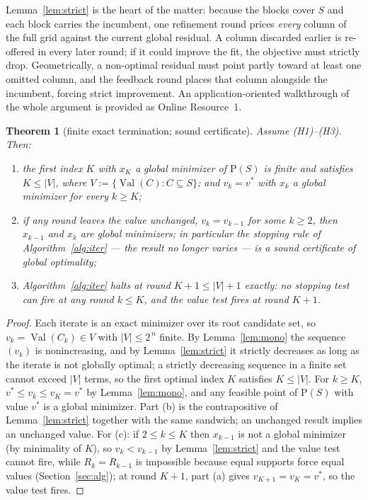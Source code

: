 \documentclass[pdflatex,sn-mathphys-num]{sn-jnl}
\theoremstyle{thmstyleone}
\newtheorem{theorem}{Theorem}
\theoremstyle{thmstyletwo}
\newcommand{\Val}{\operatorname{Val}}
\newcommand{\prob}[1]{\mathrm{P}(#1)}
\begin{document}
Lemma~\ref{lem:strict} is the heart of the matter: because the blocks
cover $S$ and each block carries the incumbent, one refinement round
prices \emph{every} column of the full grid against the current global
residual. A column discarded earlier is re-offered in every later round;
if it could improve the fit, the objective must strictly drop.
Geometrically, a non-optimal residual must point partly toward at
least one omitted column, and the feedback round places that column
alongside the incumbent, forcing strict improvement. An
application-oriented walkthrough of the whole argument is provided as
Online Resource~1.

\begin{theorem}[finite exact termination; sound certificate]
\label{thm:main}
Assume \emph{(H1)--(H3)}. Then:
\begin{enumerate}
\item[\emph{(a)}] the first index $K$ with $x_K$ a global minimizer of
$\prob{S}$ is finite and satisfies $K\le|V|$, where
$V:=\{\Val(C):C\subseteq S\}$; and $v_k=v^*$ with $x_k$ a global
minimizer for every $k\ge K$;
\item[\emph{(b)}] if any round leaves the value unchanged,
$v_k=v_{k-1}$ for some $k\ge2$, then $x_{k-1}$ and $x_k$ are global
minimizers; in particular the stopping rule of Algorithm~\ref{alg:iter}
--- the result no longer varies --- is a sound certificate of global
optimality;
\item[\emph{(c)}] Algorithm~\ref{alg:iter} halts at round
$K{+}1\le|V|{+}1$ exactly: no stopping test can fire at any round
$k\le K$, and the value test fires at round $K{+}1$.
\end{enumerate}
\end{theorem}
\begin{proof}
Each iterate is an exact minimizer over its root candidate set, so
$v_k=\Val(C_k)\in V$ with $|V|\le2^{\,n}$ finite. By
Lemma~\ref{lem:mono} the sequence $(v_k)$ is nonincreasing, and by
Lemma~\ref{lem:strict} it strictly decreases as long as the iterate is
not globally optimal; a strictly decreasing sequence in a finite set
cannot exceed $|V|$ terms, so the first optimal index $K$ satisfies
$K\le|V|$. For $k\ge K$, $v^*\le v_k\le v_K=v^*$ by
Lemma~\ref{lem:mono}, and any feasible point of $\prob{S}$ with value
$v^*$ is a global minimizer. Part (b) is the contrapositive of
Lemma~\ref{lem:strict} together with the same sandwich; an unchanged
result implies an unchanged value. For (c): if $2\le k\le K$ then
$x_{k-1}$ is not a global minimizer (by minimality of $K$), so
$v_k<v_{k-1}$ by Lemma~\ref{lem:strict} and the value test cannot
fire, while $R_k=R_{k-1}$ is impossible because equal supports force
equal values (Section~\ref{sec:alg}); at round $K{+}1$, part (a) gives
$v_{K+1}=v_K=v^*$, so the value test fires.
\end{proof}
\end{document}

